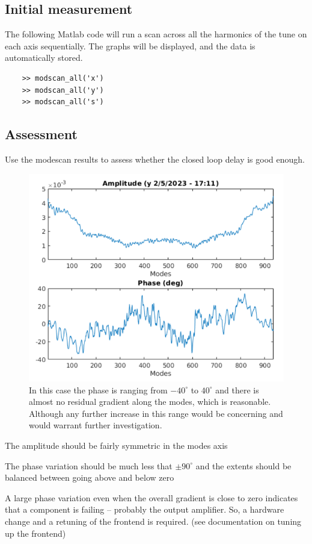\documentclass{report}
\begin{document}
\subsection{Initial measurement}
The following Matlab code will run a scan across all the harmonics of the tune on each axis sequentially. The graphs will be displayed, and the data is automatically stored.
\begin{verbatim}
    >> modscan_all('x') 
    >> modscan_all('y') 
    >> modscan_all('s') 
\end{verbatim}
\clearpage
\subsection{Assessment} 

Use the modescan results to assess whether the closed loop delay is good enough.
 
\begin{figure}[ht]
    \centering
    \includegraphics[width=0.8\linewidth]{initial_modescan.png}
    \caption{In this case the phase is ranging from $-40^\circ$ to $40^\circ$ and there is almost no residual gradient along the modes, which is reasonable. Although any further increase in this range would be concerning and would warrant further investigation.}
    \label{fig:example_modescan}
\end{figure}
 
The amplitude should be fairly symmetric in the modes axis 

The phase variation should be much less that $\pm90^\circ$ and the extents should be balanced between going above and below zero 

A large phase variation even when the overall gradient is close to zero indicates that a component is failing – probably the output amplifier. So, a hardware change and a retuning of the frontend is required. (see documentation on tuning up the frontend)
\end{document}
